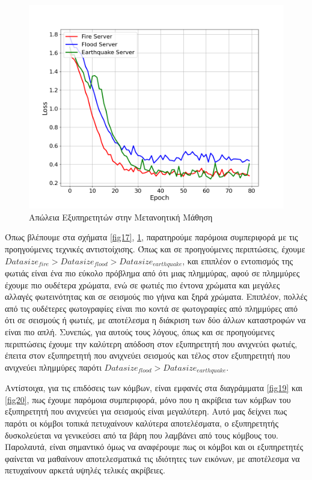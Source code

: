 \begin{figure}[ht]
    \centering
    \includegraphics[width=\textwidth]{figures/chapter4/Server_Losses.png}
    \caption{Απώλεια Εξυπηρετητών στην Μετανοητική Μάθηση}
    \label{fig18}
\end{figure}

Όπως βλέπουμε στα σχήματα \ref{fig17}, \ref{fig18}, παρατηρούμε παρόμοια συμπεριφορά με τις προηγούμενες τεχνικές αντιστοίχισης. Όπως και σε προηγούμενες περιπτώσεις, έχουμε $Datasize_{fire} > Datasize_{flood} >Datasize_{earthquake}$, και επιπλέον ο εντοπισμός της φωτιάς είναι ένα πιο εύκολο πρόβλημα από ότι μιας πλημμύρας, αφού σε πλημμύρες έχουμε πιο ουδέτερα χρώματα, ενώ σε φωτιές πιο έντονα χρώματα και μεγάλες αλλαγές φωτεινότητας και σε σεισμούς πιο γήινα και ξηρά χρώματα. Επιπλέον, πολλές από τις ουδέτερες φωτογραφίες είναι πιο κοντά σε φωτογραφίες από πλημμύρες από ότι σε σεισμούς ή φωτιές, με αποτέλεσμα η διάκριση των δύο άλλων καταστροφών να είναι πιο απλή. Συνεπώς, για αυτούς τους λόγους, όπως και σε προηγούμενες περιπτώσεις έχουμε την καλύτερη απόδοση στον εξυπηρετητή που ανιχνεύει φωτιές, έπειτα στον εξυπηρετητή που ανιχνεύει σεισμούς και τέλος στον εξυπηρετητή που ανιχνεύει πλημμύρες παρότι $Datasize_{flood} >Datasize_{earthquake}$. 

Αντίστοιχα, για τις επιδόσεις των κόμβων, είναι εμφανές στα διαγράμματα \ref*{fig19} και \ref*{fig20}, πως έχουμε παρόμοια συμπεριφορά, μόνο που η ακρίβεια των κόμβων του εξυπηρετητή που ανιχνεύει για σεισμούς είναι μεγαλύτερη. Αυτό μας δείχνει πως παρότι οι κόμβοι τοπικά πετυχαίνουν καλύτερα αποτελέσματα, ο εξυπηρετητής δυσκολεύεται να γενικεύσει από τα βάρη που λαμβάνει από τους κόμβους του. Παρολαυτά, είναι σημαντικό όμως να αναφέρουμε πως οι κόμβοι και οι εξυπηρετητές φαίνεται να μαθαίνουν αποτελεσματικά τις ιδιότητες των εικόνων, με αποτέλεσμα να πετυχαίνουν αρκετά υψηλές τελικές ακρίβειες. 

